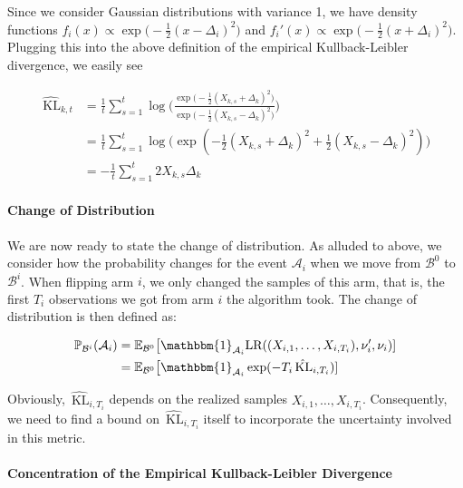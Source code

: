 \documentclass[12pt,]{article}
\let\oldparagraph\paragraph
\renewcommand{\paragraph}[1]{\oldparagraph{#1}\mbox{}}
\newcommand{\KL}{\,\text{KL}}
\begin{document}
Since we consider Gaussian distributions with variance 1, we have
density functions
\(f_i(x) \propto \exp \big(-\frac{1}{2} (x-\Delta_i)^2\big)\) and
\(f_i'(x) \propto \exp \big(-\frac{1}{2} (x+\Delta_i)^2\big)\). Plugging
this into the above definition of the empirical Kullback-Leibler
divergence, we easily see

\begin{align*}
\hat{\KL}_{k,t} & = \frac{1}{t} \sum_{s=1}^{t} \log \big(\frac{\exp \big(-\frac{1}{2} (X_{k,s}+\Delta_k)^2\big)}{\exp \big(-\frac{1}{2} (X_{k,s}-\Delta_k)^2\big)} \big) \\
& = \frac{1}{t} \sum_{s=1}^{t} \log \big( \exp(-\frac{1}{2} (X_{k,s}+\Delta_k)^2 + \frac{1}{2} (X_{k,s}-\Delta_k)^2) \big) \\
& = - \frac{1}{t} \sum_{s=1}^{t} 2 X_{k,s} \Delta_k
\end{align*}

\paragraph{Change of Distribution}\label{change-of-distribution}

We are now ready to state the change of distribution. As alluded to
above, we consider how the probability changes for the event
\(\mathcal{A}_i\) when we move from \(\mathcal{B}^0\) to
\(\mathcal{B}^i\). When flipping arm \(i\), we only changed the samples
of this arm, that is, the first \(T_i\) observations we got from arm
\(i\) the algorithm took. The change of distribution is then defined as:

\begin{align*}
\mathbb{P}_{\mathcal{B}^i}(\mathcal{A}_i) & = \mathbb{E}_{\mathcal{B}^0} \big[\mathbbm{1}_{\mathcal{A}_i} \text{LR}((X_{i,1}, \dots,X_{i,T_i}), \nu_i', \nu_i) ] \\
& = \mathbb{E}_{\mathcal{B}^0} \big[\mathbbm{1}_{\mathcal{A}_i} \exp (- T_i \hat{\KL}_{i,T_i}) ]
\end{align*}

Obviously, \(\hat{\KL}_{i,T_i}\) depends on the realized samples
\(X_{i,1}, \dots,X_{i,T_i}\). Consequently, we need to find a bound on
\(\hat{\KL}_{i,T_i}\) itself to incorporate the uncertainty involved in
this metric.

\paragraph{Concentration of the Empirical Kullback-Leibler
Divergence}\label{concentration-of-the-empirical-kullback-leibler-divergence}
\end{document}
